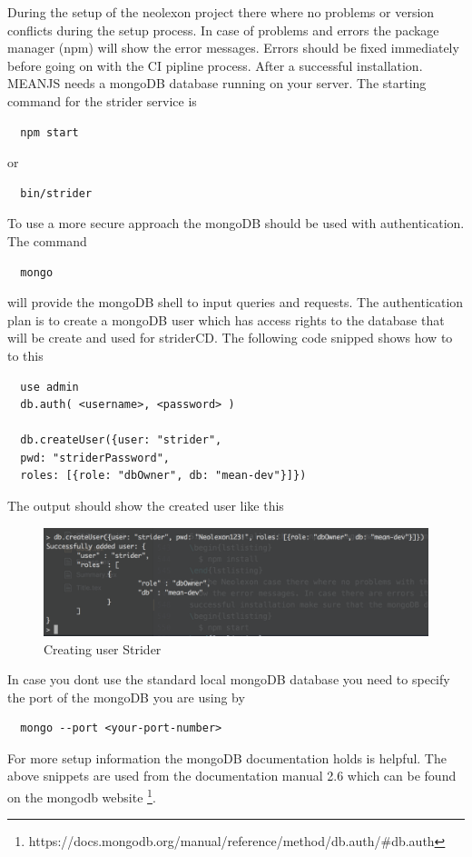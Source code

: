 During the setup of the neolexon project there where no problems or version conflicts during the setup process. In case of problems and errors
the package manager (npm) will show the error messages. Errors should be fixed immediately before going on with the CI pipline process. After a
successful installation. MEANJS needs a mongoDB database running on your server. The starting command for the strider service is
\begin{lstlisting}
  npm start
\end{lstlisting}
or
\begin{lstlisting}
  bin/strider
\end{lstlisting}
To use a more secure approach the mongoDB should be used with authentication. The command
\begin{lstlisting}
  mongo
\end{lstlisting}
will provide the mongoDB shell to input queries and requests. The authentication plan is to create a mongoDB user which has access
rights to the database that will be create and used for striderCD. The following code snipped shows how to to this
\begin{lstlisting}
  use admin
  db.auth( <username>, <password> )

  db.createUser({user: "strider",
  pwd: "striderPassword",
  roles: [{role: "dbOwner", db: "mean-dev"}]})
\end{lstlisting}
The output should show the created user like this
\begin{figure}[h!]
  \centering
  \includegraphics[width=1\textwidth]{images/createUser.png}
  \caption{Creating user Strider}
\end{figure}
In case you dont use the standard local mongoDB database you need to specify the port of the mongoDB you are using by
\begin{lstlisting}
  mongo --port <your-port-number>
\end{lstlisting}
For more setup information the mongoDB documentation holds is helpful. The above snippets are
used from the documentation manual 2.6 which can be found on the mongodb website \footnote{https://docs.mongodb.org/manual/reference/method/db.auth/#db.auth}.

